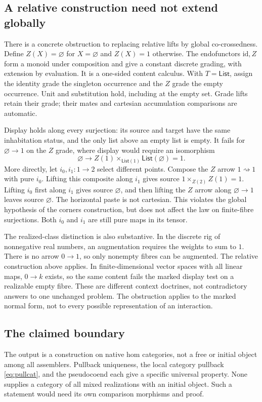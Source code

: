 \documentclass[11pt]{article}
\numberwithin{equation}{section}
\theoremstyle{definition}\newtheorem{definition}[theorem]{Definition}
\newcommand{\id}{\mathrm{id}}\newcommand{\op}{\mathrm{op}}\newcommand{\dom}{\mathrm{dom}}\newcommand{\cod}{\mathrm{cod}}
\begin{document}
\subsection{A relative construction need not extend globally}
There is a concrete obstruction to replacing relative lifts by global
co-crossedness. Define $Z(X)=\varnothing$ for $X=\varnothing$ and
$Z(X)=1$ otherwise. The endofunctors $\id,Z$ form a monoid under
composition and give a constant discrete grading, with extension by
evaluation. It is a one-sided content calculus. With $T=\mathsf{List}$,
assign the identity grade the singleton occurrence and the $Z$ grade the
empty occurrence. Unit and substitution hold, including at the empty set.
Grade lifts retain their grade; their mates and cartesian accumulation
comparisons are automatic.

Display holds along every surjection: its source and target have the
same inhabitation status, and the only list above an empty list is empty.
It fails for $\varnothing\to1$ on the $Z$ grade, where display would
require an isomorphism
\[
        \varnothing\longrightarrow
 Z(1)\times_{\mathsf{List}(1)}\mathsf{List}(\varnothing)=1.
\]
More directly, let $i_0,i_1:1\to2$ select different points. Compose the
$Z$ arrow $1\rightsquigarrow1$ with pure $i_0$. Lifting this composite
along $i_1$ gives source $1\times_{Z(2)}Z(1)=1$. Lifting $i_0$ first
along $i_1$ gives source $\varnothing$, and then lifting the $Z$ arrow
along $\varnothing\to1$ leaves source $\varnothing$. The horizontal
paste is not cartesian. This violates the global hypothesis of the
corners construction, but does not affect the law on finite-fibre
surjections. Both $i_0$ and $i_1$ are still pure maps in its tensor.

The realized-class distinction is also substantive. In the discrete rig of nonnegative real numbers, an augmentation
requires the weights to sum to $1$. There is no arrow $0\to1$, so only
nonempty fibres can be augmented. The relative construction above applies. In
finite-dimensional vector spaces with all linear maps, $0\to k$ exists,
so the same content fails the marked display test on a realizable empty
fibre. These are different context doctrines, not contradictory answers
to one unchanged problem. The obstruction applies to the marked normal
form, not to every possible representation of an interaction.

\subsection{The claimed boundary}
The output is a construction on native hom categories, not a free or
initial object among all assemblers. Pullback uniqueness, the local
category pullback \eqref{eq:pullcat}, and the pseudocoend each give a
specific universal property. None supplies a category of all mixed
realizations with an initial object. Such a statement would need its own
comparison morphisms and proof.
\end{document}
